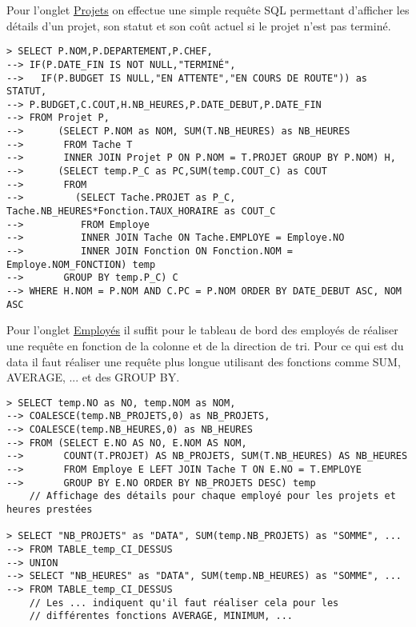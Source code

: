 Pour l'onglet \href{http://ms8db.montefiore.ulg.ac.be/s191230/projects.php}{Projets} on effectue une simple requête SQL permettant d'afficher les détails d'un projet, son statut et son coût actuel si le projet n'est pas terminé.
\begin{verbatim}
> SELECT P.NOM,P.DEPARTEMENT,P.CHEF,
--> IF(P.DATE_FIN IS NOT NULL,"TERMINÉ",
-->   IF(P.BUDGET IS NULL,"EN ATTENTE","EN COURS DE ROUTE")) as STATUT,
--> P.BUDGET,C.COUT,H.NB_HEURES,P.DATE_DEBUT,P.DATE_FIN 
--> FROM Projet P,
-->      (SELECT P.NOM as NOM, SUM(T.NB_HEURES) as NB_HEURES 
-->       FROM Tache T 
-->       INNER JOIN Projet P ON P.NOM = T.PROJET GROUP BY P.NOM) H,
-->      (SELECT temp.P_C as PC,SUM(temp.COUT_C) as COUT 
-->       FROM 
-->         (SELECT Tache.PROJET as P_C, Tache.NB_HEURES*Fonction.TAUX_HORAIRE as COUT_C 
-->          FROM Employe 
-->          INNER JOIN Tache ON Tache.EMPLOYE = Employe.NO 
-->          INNER JOIN Fonction ON Fonction.NOM = Employe.NOM_FONCTION) temp 
-->       GROUP BY temp.P_C) C 
--> WHERE H.NOM = P.NOM AND C.PC = P.NOM ORDER BY DATE_DEBUT ASC, NOM ASC
\end{verbatim}

Pour l'onglet \href{http://ms8db.montefiore.ulg.ac.be/s191230/employes.php}{Employés} il suffit pour le tableau de bord des employés de réaliser une requête en fonction de la colonne et de la direction de tri. Pour ce qui est du data il faut réaliser une requête plus longue utilisant des fonctions comme SUM, AVERAGE, ... et des GROUP BY.

\begin{verbatim}
> SELECT temp.NO as NO, temp.NOM as NOM, 
--> COALESCE(temp.NB_PROJETS,0) as NB_PROJETS, 
--> COALESCE(temp.NB_HEURES,0) as NB_HEURES 
--> FROM (SELECT E.NO AS NO, E.NOM AS NOM, 
-->       COUNT(T.PROJET) AS NB_PROJETS, SUM(T.NB_HEURES) AS NB_HEURES 
-->       FROM Employe E LEFT JOIN Tache T ON E.NO = T.EMPLOYE 
-->       GROUP BY E.NO ORDER BY NB_PROJETS DESC) temp
    // Affichage des détails pour chaque employé pour les projets et heures prestées

> SELECT "NB_PROJETS" as "DATA", SUM(temp.NB_PROJETS) as "SOMME", ...
--> FROM TABLE_temp_CI_DESSUS
--> UNION 
--> SELECT "NB_HEURES" as "DATA", SUM(temp.NB_HEURES) as "SOMME", ... 
--> FROM TABLE_temp_CI_DESSUS
    // Les ... indiquent qu'il faut réaliser cela pour les 
    // différentes fonctions AVERAGE, MINIMUM, ...
\end{verbatim}